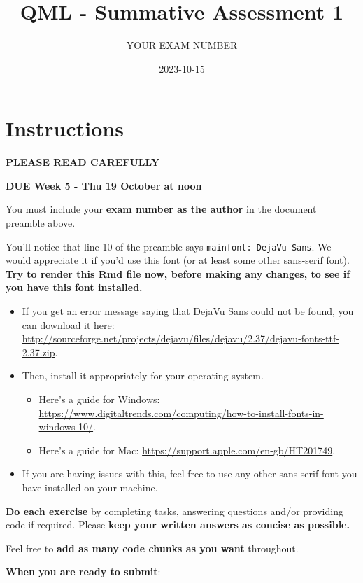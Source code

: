 \documentclass[
]{article}
\title{QML - Summative Assessment 1}
\author{YOUR EXAM NUMBER}
\date{2023-10-15}
\providecommand{\tightlist}{%
  \setlength{\itemsep}{0pt}\setlength{\parskip}{0pt}}
\begin{document}
\maketitle

\section{Instructions}\label{instructions}

\textbf{PLEASE READ CAREFULLY}

\textbf{DUE Week 5 - Thu 19 October at noon}

You must include your \textbf{exam number as the author} in the document
preamble above.

You'll notice that line 10 of the preamble says
\texttt{mainfont:\ DejaVu\ Sans}. We would appreciate it if you'd use
this font (or at least some other sans-serif font). \textbf{Try to
render this Rmd file now, before making any changes, to see if you have
this font installed.}

\begin{itemize}
\tightlist
\item
  If you get an error message saying that DejaVu Sans could not be
  found, you can download it here:
  \url{http://sourceforge.net/projects/dejavu/files/dejavu/2.37/dejavu-fonts-ttf-2.37.zip}.
\item
  Then, install it appropriately for your operating system.

  \begin{itemize}
  \tightlist
  \item
    Here's a guide for Windows:
    \url{https://www.digitaltrends.com/computing/how-to-install-fonts-in-windows-10/}.
  \item
    Here's a guide for Mac:
    \url{https://support.apple.com/en-gb/HT201749}.
  \end{itemize}
\item
  If you are having issues with this, feel free to use any other
  sans-serif font you have installed on your machine.
\end{itemize}

\textbf{Do each exercise} by completing tasks, answering questions
and/or providing code if required. Please \textbf{keep your written
answers as concise as possible.}

Feel free to \textbf{add as many code chunks as you want} throughout.

\textbf{When you are ready to submit}:
\end{document}
